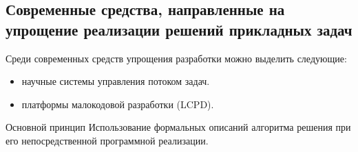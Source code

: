 \subsection{Современные средства, направленные на упрощение реализации решений прикладных задач}
\begin{frame}

  {\smaller[1]
    Среди современных средств упрощения разработки можно выделить следующие:
    \begin{itemize}
      \item научные системы управления потоком задач.
      \item платформы малокодовой разработки (LCPD).
    \end{itemize}
  }

  \begin{block}{Основной принцип}
    \smaller[1]
    Использование формальных описаний алгоритма решения при его непосредственной программной реализации.
  \end{block}


\end{frame}
